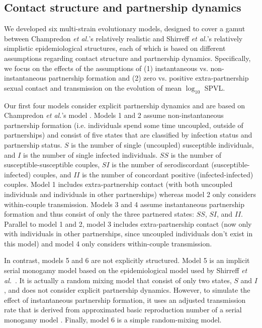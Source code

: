\documentclass[10pt,letterpaper]{article}
\newcommand{\Lspvl}{$\log_{10}$ SPVL}
\newcommand{\etal}{\textit{et al.}}
\begin{document}
\subsection*{Contact structure and partnership dynamics}

We developed six multi-strain evolutionary models, designed to cover a gamut between Champredon \etal's relatively realistic \cite{champredon_hiv_2013} and Shirreff \etal's relatively simplistic \cite{shirreff_transmission_2011} epidemiological structures, each of which is based on different assumptions regarding contact structure and partnership dynamics. Specifically, we focus on the effects of the assumptions of (1) instantaneous vs. non-instantaneous partnership formation and (2) zero vs. positive extra-partnership sexual contact and transmission on the evolution of mean \Lspvl.

Our first four models consider explicit partnership dynamics and are based on Champredon \etal's model \cite{champredon_hiv_2013}. Models 1 and 2 assume non-instantaneous partnership formation (i.e. individuals spend some time uncoupled, outside of partnerships) and consist of five states that are classified by infection status and partnership status. $S$ is the number of single (uncoupled) susceptible individuals, and $I$ is the number of single infected individuals. $SS$ is the number of susceptible-susceptible couples, $SI$ is the number of serodiscordant (susceptible-infected) couples, and $II$ is the number of concordant positive (infected-infected) couples. Model 1 includes extra-partnership contact (with both uncoupled individuals and individuals in other partnerships) whereas model 2 only considers within-couple transmission. Models 3 and 4 assume instantaneous partnership formation and thus consist of only the three partnered states: $SS$, $SI$, and $II$. Parallel to model 1 and 2, model 3 includes extra-partnership contact (now only with individuals in other partnerships, since uncoupled individuals don't exist in this model) and model 4 only considers within-couple transmission.

In contrast, models 5 and 6 are not explicitly structured.  Model 5 is an implicit serial monogamy model based on the epidemiological model used by Shirreff \etal\ \cite{shirreff_transmission_2011}. It is actually a random mixing model that consist of only two states, $S$ and $I$, and does not consider explicit partnership dynamics. However, to simulate the effect of instantaneous partnership formation, it uses an adjusted transmission rate that is derived from approximated basic reproduction number of a serial monogamy model \cite{hollingsworth_hiv1_2008}. Finally, model 6 is a simple random-mixing model.
\end{document}
